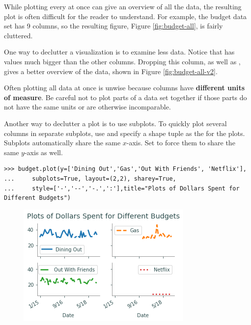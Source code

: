 While plotting every  at once can give an overview of all the data, the resulting plot is often difficult for the reader to understand.
For example, the budget data set has 9 columns, so the resulting figure, Figure \ref{fig:budget-all}, is fairly cluttered.

One way to declutter a visualization is to examine less data.
Notice that  has values much bigger than the other columns.
Dropping this column, as well as , gives a better overview of the data, shown in Figure \ref{fig:budget-all-v2}.

\begin{warn}
Often plotting all data at once is unwise because columns have \textbf{different units of measure}.
Be careful not to plot parts of a data set together if those parts do not have the same units or are otherwise incomparable.
\end{warn}

Another way to declutter a plot is to use subplots.
To quickly plot several columns in separate subplots, use  and specify a shape tuple as the  for the plots.
Subplots automatically share the same $x$-axis.
Set  to force them to share the same $y$-axis as well.

\begin{lstlisting}
>>> budget.plot(y=['Dining Out','Gas','Out With Friends', 'Netflix'],
... 	subplots=True, layout=(2,2), sharey=True,
... 	style=['-','--','-.',':'],title="Plots of Dollars Spent for Different Budgets")
\end{lstlisting}

\begin{figure}[H]
    \includegraphics[width=.8\textwidth]{figures/line_subplots.pdf}
\end{figure}

